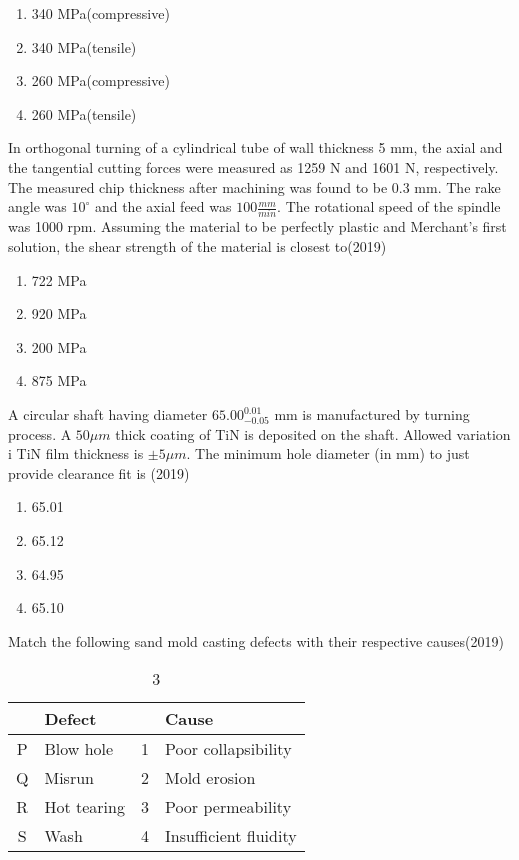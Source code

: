     \begin{enumerate}[label=(\Alph*)]
        \item 340 MPa(compressive)
        \item 340 MPa(tensile)
        \item 260 MPa(compressive)
        \item 260 MPa(tensile)
    \end{enumerate}
    \item In orthogonal turning of a cylindrical tube of wall thickness 5 mm, the axial and the tangential cutting forces were measured as 1259 N and 1601 N, respectively. The measured chip thickness after machining was found to be 0.3 mm. The rake angle was $10^{\circ}$ and the axial feed was $100 \frac{mm}{min}$. The rotational speed of the spindle was 1000 rpm. Assuming the material to be perfectly plastic and Merchant's first solution, the shear strength of the material is closest to\hfill (2019)
    \begin{enumerate}[label=(\Alph*)]
        \item 722 MPa
        \item 920 MPa
        \item 200 MPa
        \item 875 MPa
    \end{enumerate}
    \item A circular shaft having diameter $65.00^{0.01}_{-0.05}$ mm is manufactured by turning process. A $50\mu m$ thick coating of TiN is deposited on the shaft. Allowed variation i TiN film thickness is $\pm 5\mu m$. The minimum hole diameter (in mm) to just provide clearance fit is \hfill (2019)
    \begin{enumerate}[label=(\Alph*)]
        \item 65.01
        \item 65.12
        \item 64.95
        \item 65.10
    \end{enumerate}
    \item Match the following sand mold casting defects with their respective causes\hfill (2019)
    \begin{table}[!ht]
        \centering
        \begin{tabular}{|c|l|c|l|}
            \hline
            \textbf{} & \textbf{Defect} & \textbf{} & \textbf{Cause} \\
            \hline
            P & Blow hole & 1 & Poor collapsibility \\
            Q & Misrun & 2 & Mold erosion \\
            R & Hot tearing & 3 & Poor permeability \\
            S & Wash & 4 & Insufficient fluidity \\
            \hline
        \end{tabular} %
        \caption{3}
    \end{table}
